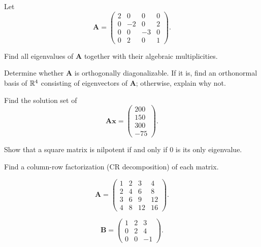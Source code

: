 \documentclass[11pt,oneside]{article}
\begin{document}
\begin{problem}
Let
\[
\mathbf A=
\begin{pmatrix}
2&0&0&0\\
0&-2&0&2\\
0&0&-3&0\\
0&2&0&1
\end{pmatrix}.
\]
\begin{problemsubparts}
\item Find all eigenvalues of $\mathbf A$ together with their algebraic multiplicities.
\item Determine whether $\mathbf A$ is orthogonally diagonalizable. If it is, find an orthonormal basis of $\mathbb{R}^4$ consisting of eigenvectors of $\mathbf A$; otherwise, explain why not.
\item Find the solution set of
\[
\mathbf A\mathbf x=
\begin{pmatrix}
200\\150\\300\\-75
\end{pmatrix}.
\]
\end{problemsubparts}
\end{problem}

\begin{problem}
Show that a square matrix is nilpotent if and only if $0$ is its only eigenvalue.
\end{problem}

\begin{problem}
Find a column-row factorization (CR decomposition) of each matrix.
\begin{problemsubparts}
\item
\[
\mathbf A=
\begin{pmatrix}
1&2&3&4\\
2&4&6&8\\
3&6&9&12\\
4&8&12&16
\end{pmatrix}.
\]
\item
\[
\mathbf B=
\begin{pmatrix}
1&2&3\\
0&2&4\\
0&0&-1
\end{pmatrix}.
\]
\end{problemsubparts}
\end{problem}
\end{document}
